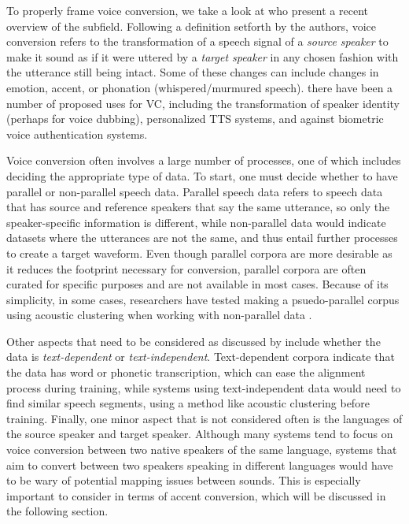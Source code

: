 \documentclass
[
    a4paper,
    twoside,
    12pt,
]
{report}
\begin{document}
To properly frame voice conversion, we take a look at
\textcite{mohammadi2017} who present a recent overview of the subfield.
Following a definition setforth by the authors, voice conversion refers
to the transformation of a speech signal of a \emph{source speaker} to
make it sound as if it were uttered by a \emph{target speaker} in any
chosen fashion with the utterance still being intact. Some of these
changes can include changes in emotion, accent, or phonation
(whispered/murmured speech). there have been a number of proposed uses
for VC, including the transformation of speaker identity (perhaps for
voice dubbing), personalized TTS systems, and against biometric voice
authentication systems.

Voice conversion often involves a large number of processes, one of
which includes deciding the appropriate type of data. To start, one must
decide whether to have parallel or non-parallel speech data. Parallel
speech data refers to speech data that has source and reference speakers
that say the same utterance, so only the speaker-specific information is
different, while non-parallel data would indicate datasets where the
utterances are not the same, and thus entail further processes to create
a target waveform. Even though parallel corpora are more desirable as it
reduces the footprint necessary for conversion, parallel corpora are
often curated for specific purposes and are not available in most cases.
Because of its simplicity, in some cases, researchers have tested making
a psuedo-parallel corpus using acoustic clustering when working with
non-parallel data \parencite{lorenzo-trueba2018, sundermann2006}.

Other aspects that need to be considered as discussed by
\textcite{mohammadi2017} include whether the data is
\emph{text-dependent} or \emph{text-independent}. Text-dependent corpora
indicate that the data has word or phonetic transcription, which can
ease the alignment process during training, while systems using
text-independent data would need to find similar speech segments, using
a method like acoustic clustering before training. Finally, one minor
aspect that is not considered often is the languages of the source
speaker and target speaker. Although many systems tend to focus on voice
conversion between two native speakers of the same language, systems
that aim to convert between two speakers speaking in different languages
would have to be wary of potential mapping issues between sounds. This
is especially important to consider in terms of accent conversion, which
will be discussed in the following section.
\end{document}
